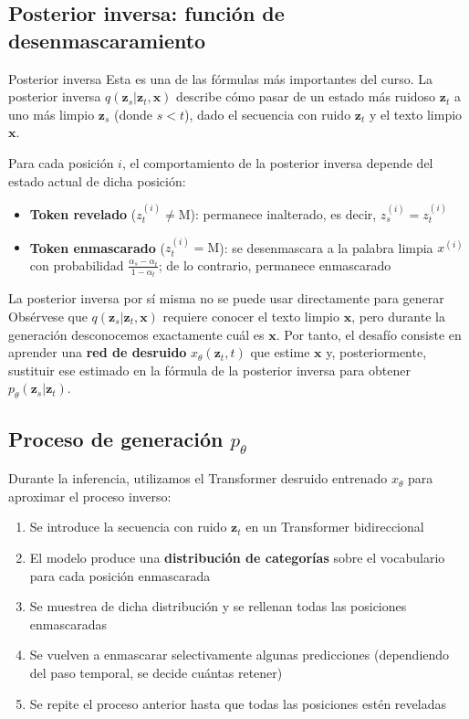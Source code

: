 \subsection{Posterior inversa: función de desenmascaramiento}

\begin{importantbox}{Posterior inversa}
Esta es una de las fórmulas más importantes del curso. La posterior inversa $q(\mathbf{z}_s | \mathbf{z}_t, \mathbf{x})$ describe cómo pasar de un estado más ruidoso $\mathbf{z}_t$ a uno más limpio $\mathbf{z}_s$ (donde $s < t$), dado el secuencia con ruido $\mathbf{z}_t$ y el texto limpio $\mathbf{x}$.
\end{importantbox}

Para cada posición $i$, el comportamiento de la posterior inversa depende del estado actual de dicha posición:
\begin{itemize}
    \item \textbf{Token revelado} ($z_t^{(i)} \neq \text{M}$): permanece inalterado, es decir, $z_s^{(i)} = z_t^{(i)}$
    \item \textbf{Token enmascarado} ($z_t^{(i)} = \text{M}$): se desenmascara a la palabra limpia $x^{(i)}$ con probabilidad $\frac{\alpha_s - \alpha_t}{1 - \alpha_t}$; de lo contrario, permanece enmascarado
\end{itemize}

\begin{warningbox}{La posterior inversa por sí misma no se puede usar directamente para generar}
Obsérvese que $q(\mathbf{z}_s | \mathbf{z}_t, \mathbf{x})$ requiere conocer el texto limpio $\mathbf{x}$, pero durante la generación desconocemos exactamente cuál es $\mathbf{x}$. Por tanto, el desafío consiste en aprender una \textbf{red de desruido} $x_\theta(\mathbf{z}_t, t)$ que estime $\mathbf{x}$ y, posteriormente, sustituir ese estimado en la fórmula de la posterior inversa para obtener $p_\theta(\mathbf{z}_s | \mathbf{z}_t)$.
\end{warningbox}

\subsection{Proceso de generación $p_\theta$}

Durante la inferencia, utilizamos el Transformer desruido entrenado $x_\theta$ para aproximar el proceso inverso:

\begin{enumerate}
    \item Se introduce la secuencia con ruido $\mathbf{z}_t$ en un Transformer bidireccional
    \item El modelo produce una \textbf{distribución de categorías} sobre el vocabulario para cada posición enmascarada
    \item Se muestrea de dicha distribución y se rellenan todas las posiciones enmascaradas
    \item Se vuelven a enmascarar selectivamente algunas predicciones (dependiendo del paso temporal, se decide cuántas retener)
    \item Se repite el proceso anterior hasta que todas las posiciones estén reveladas
\end{enumerate}

